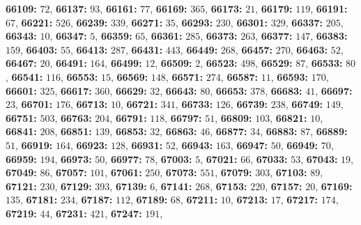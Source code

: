 \textsf{\bfseries 66109:} $72$, \textsf{\bfseries 66137:} $93$, \textsf{\bfseries 66161:} $77$, \textsf{\bfseries 66169:} $365$, \textsf{\bfseries 66173:} $21$, \textsf{\bfseries 66179:} $119$, \textsf{\bfseries 66191:} $67$, \textsf{\bfseries 66221:} $526$, \textsf{\bfseries 66239:} $339$, \textsf{\bfseries 66271:} $35$, \textsf{\bfseries 66293:} $230$, \textsf{\bfseries 66301:} $329$, \textsf{\bfseries 66337:} $205$, \textsf{\bfseries 66343:} $10$, \textsf{\bfseries 66347:} $5$, \textsf{\bfseries 66359:} $65$, \textsf{\bfseries 66361:} $285$, \textsf{\bfseries 66373:} $263$, \textsf{\bfseries 66377:} $147$, \textsf{\bfseries 66383:} $159$, \textsf{\bfseries 66403:} $55$, \textsf{\bfseries 66413:} $287$, \textsf{\bfseries 66431:} $443$, \textsf{\bfseries 66449:} $268$, \textsf{\bfseries 66457:} $270$, \textsf{\bfseries 66463:} $52$, \textsf{\bfseries 66467:} $20$, \textsf{\bfseries 66491:} $164$, \textsf{\bfseries 66499:} $12$, \textsf{\bfseries 66509:} $2$, \textsf{\bfseries 66523:} $498$, \textsf{\bfseries 66529:} $87$, \textsf{\bfseries 66533:} $80$, \textsf{\bfseries 66541:} $116$, \textsf{\bfseries 66553:} $15$, \textsf{\bfseries 66569:} $148$, \textsf{\bfseries 66571:} $274$, \textsf{\bfseries 66587:} $11$, \textsf{\bfseries 66593:} $170$, \textsf{\bfseries 66601:} $325$, \textsf{\bfseries 66617:} $360$, \textsf{\bfseries 66629:} $32$, \textsf{\bfseries 66643:} $80$, \textsf{\bfseries 66653:} $378$, \textsf{\bfseries 66683:} $41$, \textsf{\bfseries 66697:} $23$, \textsf{\bfseries 66701:} $176$, \textsf{\bfseries 66713:} $10$, \textsf{\bfseries 66721:} $341$, \textsf{\bfseries 66733:} $126$, \textsf{\bfseries 66739:} $238$, \textsf{\bfseries 66749:} $149$, \textsf{\bfseries 66751:} $503$, \textsf{\bfseries 66763:} $204$, \textsf{\bfseries 66791:} $118$, \textsf{\bfseries 66797:} $51$, \textsf{\bfseries 66809:} $103$, \textsf{\bfseries 66821:} $10$, \textsf{\bfseries 66841:} $208$, \textsf{\bfseries 66851:} $139$, \textsf{\bfseries 66853:} $32$, \textsf{\bfseries 66863:} $46$, \textsf{\bfseries 66877:} $34$, \textsf{\bfseries 66883:} $87$, \textsf{\bfseries 66889:} $51$, \textsf{\bfseries 66919:} $164$, \textsf{\bfseries 66923:} $128$, \textsf{\bfseries 66931:} $52$, \textsf{\bfseries 66943:} $163$, \textsf{\bfseries 66947:} $50$, \textsf{\bfseries 66949:} $70$, \textsf{\bfseries 66959:} $194$, \textsf{\bfseries 66973:} $50$, \textsf{\bfseries 66977:} $78$, \textsf{\bfseries 67003:} $5$, \textsf{\bfseries 67021:} $66$, \textsf{\bfseries 67033:} $53$, \textsf{\bfseries 67043:} $19$, \textsf{\bfseries 67049:} $86$, \textsf{\bfseries 67057:} $101$, \textsf{\bfseries 67061:} $250$, \textsf{\bfseries 67073:} $551$, \textsf{\bfseries 67079:} $303$, \textsf{\bfseries 67103:} $89$, \textsf{\bfseries 67121:} $230$, \textsf{\bfseries 67129:} $393$, \textsf{\bfseries 67139:} $6$, \textsf{\bfseries 67141:} $268$, \textsf{\bfseries 67153:} $220$, \textsf{\bfseries 67157:} $20$, \textsf{\bfseries 67169:} $135$, \textsf{\bfseries 67181:} $234$, \textsf{\bfseries 67187:} $112$, \textsf{\bfseries 67189:} $68$, \textsf{\bfseries 67211:} $10$, \textsf{\bfseries 67213:} $17$, \textsf{\bfseries 67217:} $174$, \textsf{\bfseries 67219:} $44$, \textsf{\bfseries 67231:} $421$, \textsf{\bfseries 67247:} $191$, 
